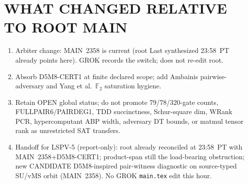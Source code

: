\documentclass[11pt]{article}
\begin{document}
\section*{WHAT CHANGED RELATIVE TO ROOT MAIN}
\begin{enumerate}
\item Arbiter change: MAIN~2358 is current (root Last synthesized 23:58~PT
already points here). GROK records the switch; does not re-edit root.
\item Absorb D5M8-CERT1 at finite declared scope; add Ambainis pairwise-adversary
and Yang et al.\ $\mathbb F_2$ saturation hygiene.
\item Retain OPEN global status; do not promote $79$/$78$/$320$-gate counts,
FULLPAIR6/PAIRDEG1, TDD succinctness, Schur-square dim, WRank PCR,
hypercomputant ABP width, adversary DT bounds, or matmul tensor rank as
unrestricted SAT transfers.
\item Handoff for LSPV-5 (report-only): root already reconciled at 23:58~PT with
MAIN~2358+D5M8-CERT1; product-span still the load-bearing obstruction; new
CANDIDATE D5M8-inspired pair-witness diagnostic on source-typed SU/vMS orbit
(MAIN~2358). No GROK \texttt{main.tex} edit this hour.
\end{enumerate}
\end{document}
